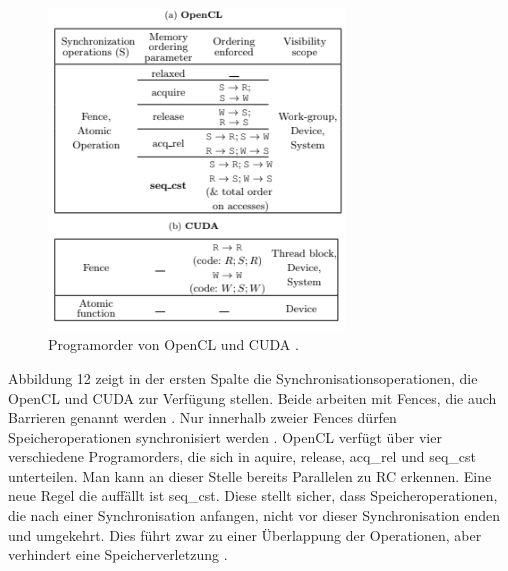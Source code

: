 \documentclass[final,bibliography=totocnumbered]{include/sikseminar}
\begin{document}

\begin{figure}[htbp] %
  \centering
  \includegraphics[width=0.7\textwidth]{figures/cudagpu}
  \caption{Programorder von OpenCL und CUDA \cite{eesmog}.}
  \label{Fig:cudagpu}
\end{figure}

Abbildung 12 zeigt in der ersten Spalte die Synchronisationsoperationen, die OpenCL und CUDA zur Verfügung stellen.
Beide arbeiten mit Fences, die auch Barrieren genannt werden \cite{fences}. 
Nur innerhalb zweier Fences dürfen Speicheroperationen synchronisiert werden \cite{smcmtutorial}. 
OpenCL verfügt über vier verschiedene Programorders, die sich in aquire, release, acq\_rel und seq\_cst unterteilen.
Man kann an dieser Stelle bereits Parallelen zu RC erkennen.
Eine neue Regel die auffällt ist seq\_cst.  Diese stellt sicher, dass Speicheroperationen, die nach einer Synchronisation anfangen, 
nicht vor dieser Synchronisation enden und umgekehrt. Dies führt zwar zu einer Überlappung der Operationen, aber verhindert eine Speicherverletzung \cite{eesmog}.
\end{document}

